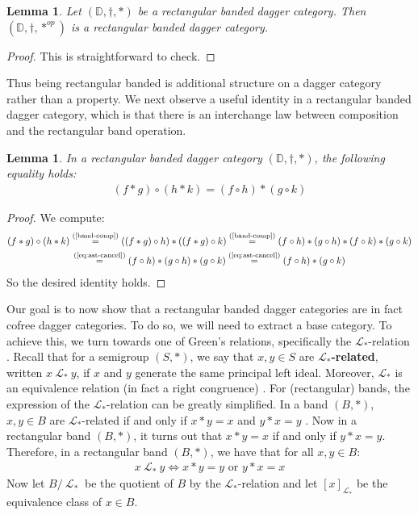 \documentclass[10pt]{article}
\newtheorem{lemma}[observation]{Lemma}  %
\begin{document}
\begin{lemma} Let $(\mathbb{D},\dagger, \ast)$ be a rectangular banded dagger category. Then $(\mathbb{D},\dagger, \ast^{op})$ is a rectangular banded dagger category. 
\end{lemma}
\begin{proof} This is straightforward to check. 
\end{proof}

Thus being rectangular banded is additional structure on a dagger category rather than a property. We next observe a useful identity in a rectangular banded dagger category, which is that there is an interchange law between composition and the rectangular band operation. 

\begin{lemma} In a rectangular banded dagger category $(\mathbb{D},\dagger, \ast)$, the following equality holds: 
\begin{align}\label{ast-inter}
(f \ast g) \circ (h \ast k ) =  (f \circ h) \ast (g \circ k)
\end{align}
\end{lemma}
\begin{proof} We compute:
\begin{gather*}(f \ast g) \circ (h \ast k) \overset{\text{(\ref{band-comp})}}{=} \left( (f \ast g) \circ h \right) \ast \left( (f \ast g) \circ k \right) \overset{\text{(\ref{band-comp})}}{=} (f \circ h) \ast (g \circ h) \ast (f \circ k ) \ast ( g \circ k) \\
\overset{\text{(\ref{eq:ast-cancel})}}{=} (f \circ h) \ast (g \circ h)  \ast ( g \circ k) \overset{\text{(\ref{eq:ast-cancel})}}{=}  (f \circ h) \ast ( g \circ k)
\end{gather*}
So the desired identity holds. 
\end{proof}

Our goal is to now show that a rectangular banded dagger categories are in fact cofree dagger categories. To do so, we will need to extract a base category. To achieve this, we turn towards one of Green's relations, specifically the $\mathcal{L}_\ast$-relation \cite[Chap II]{howie1976introduction}. Recall that for a semigroup $(S,\ast)$, we say that $x, y \in S$ are \textbf{$\mathcal{L}_\ast$-related}, written $x ~\mathcal{L}_\ast~ y$, if $x$ and $y$ generate the same principal left ideal. Moreover, $\mathcal{L}_\ast$ is an equivalence relation (in fact a right congruence) \cite[Chap II, Lem 1.2]{howie1976introduction}. For (rectangular) bands, the expression of the $\mathcal{L}_\ast$-relation can be greatly simplified. In a band $(B,\ast)$, $x,y \in B$ are $\mathcal{L}_\ast$-related if and only if $x \ast y=x$ and $y \ast x=y$ \cite[Lem 4]{mclean}. Now in a rectangular band $(B,\ast)$, it turns out that $x \ast y=x$ if and only if $y \ast x=y$. Therefore, in a rectangular band $(B,\ast)$, we have that for all $x,y \in B$:
\begin{align}\label{def:sim}
x ~\mathcal{L}_\ast~ y \Leftrightarrow x \ast y = y \text{ or } y \ast x = x
\end{align}
Now let $B/~\mathcal{L}_\ast~$ be the quotient of $B$ by the $\mathcal{L}_\ast$-relation and let $[x]_{\mathcal{L}_\ast}$ be the equivalence class of $x \in B$. 
\end{document}
